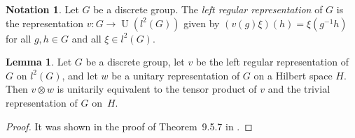 \documentclass[10pt]{amsart}
\numberwithin{equation}{section}
\theoremstyle{definition}
\newtheorem{lem}[thm]{Lemma}
\newtheorem{ntn}[thm]{Notation}
\newcommand{\U}{{\operatorname{U}}}
\begin{document}
\begin{ntn}\label{D_3407_DRegRep}
Let $G$ be a discrete group.
The {\emph{left regular representation}}
of $G$ is the representation  $v \colon G \to \U (l^2 (G))$
given by
$(v (g) \xi) (h) = \xi (g^{-1} h)$
for all $g, h \in G$ and all $\xi \in l^2 (G)$.
\end{ntn}

\begin{lem}\label{Left_R_absorb}
Let $G$ be a discrete group, let $v$ be the left regular representation of $G$ on $l^2 (G)$,
and let $w$ be a unitary representation of $G$ on a Hilbert space $H$.
Then 
$v \otimes w$ is unitarily equivalent
to the tensor product of $v$ and the trivial representation
of $G$ on~$H$.
\end{lem}

\begin{proof}
It was shown in the proof of Theorem~9.5.7 in \cite{GKPT18}.
\end{proof}
%
\end{document}
